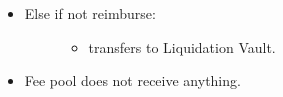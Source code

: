 \documentclass[a4paper,10pt,english]{sphinxmanual}
\begin{document}
\begin{itemize}
\begin{description}
\begin{itemize}
\begin{description}
\begin{itemize}
\end{itemize}

\end{description}

\item {} \begin{description}
\item[{Else if not reimburse:}] \leavevmode\begin{itemize}
\item {} 
transfers  to Liquidation Vault.

\end{itemize}

\end{description}

\item {} 
Fee pool does not receive anything.

\end{itemize}

\end{description}

\end{itemize}
\end{document}
